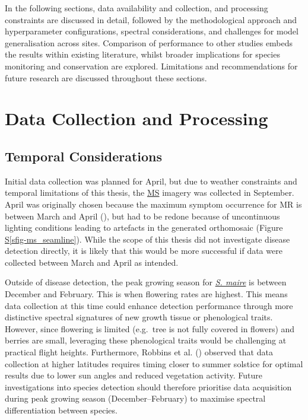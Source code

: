 \documentclass[
]{scrreprt}
\newcommand*\quartosfigref[1]{Figure \hyperref[#1]{S\ref{#1}}}
\begin{document}
In the following sections, data availability and collection, and
processing constraints are discussed in detail, followed by the
methodological approach and hyperparameter configurations, spectral
considerations, and challenges for model generalisation across sites.
Comparison of performance to other studies embeds the results within
existing literature, whilst broader implications for species monitoring
and conservation are explored. Limitations and recommendations for
future research are discussed throughout these sections.

\section{Data Collection and
Processing}\label{data-collection-and-processing}

\subsection{Temporal Considerations}\label{temporal-considerations}

Initial data collection was planned for April, but due to weather
constraints and temporal limitations of this thesis, the
\hyperref[acronyms_MS]{MS} imagery was collected in September. April was
originally chosen because the maximum symptom occurrence for MR is
between March and April
(), but
had to be redone because of uncontinuous lighting conditions leading to
artefacts in the generated orthomosaic
(\quartosfigref{sfig-ms_seamline}). While the scope of this thesis did
not investigate disease detection directly, it is likely that this would
be more successful if data were collected between March and April as
intended.

Outside of disease detection, the peak growing season for
\hyperref[acronyms_SM]{\emph{S. maire}} is between December and
February. This is when flowering rates are highest. This means data
collection at this time could enhance detection performance through more
distinctive spectral signatures of new growth tissue or phenological
traits. However, since flowering is limited (e.g.~tree is not fully
covered in flowers) and berries are small, leveraging these phenological
traits would be challenging at practical flight heights. Furthermore,
Robbins et al. () observed
that data collection at higher latitudes requires timing closer to
summer solstice for optimal results due to lower sun angles and reduced
vegetation activity. Future investigations into species detection should
therefore prioritise data acquisition during peak growing season
(December--February) to maximise spectral differentiation between
species.
\end{document}
